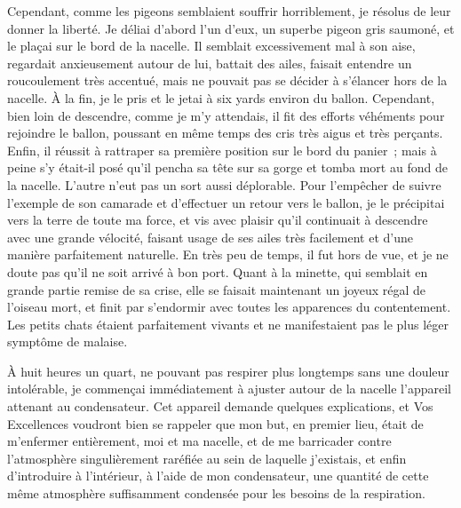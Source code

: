 \documentclass[french,twoside]{book} %
\begin{document}
Cependant, comme les pigeons semblaient souffrir horriblement, je résolus de leur donner la liberté. Je déliai d’abord l’un d’eux, un superbe pigeon gris saumoné, et le plaçai sur le bord de la nacelle. Il semblait excessivement mal à son aise, regardait anxieusement autour de lui, battait des ailes, faisait entendre un roucoulement très accentué, mais ne pouvait pas se décider à s’élancer hors de la nacelle. À la fin, je le pris et le jetai à six yards environ du ballon. Cependant, bien loin de descendre, comme je m’y attendais, il fit des efforts véhéments pour rejoindre le ballon, poussant en même temps des cris très aigus et très perçants. Enfin, il réussit à rattraper sa première position sur le bord du panier ; mais à peine s’y était-il posé qu’il pencha sa tête sur sa gorge et tomba mort au fond de la nacelle. L’autre n’eut pas un sort aussi déplorable. Pour l’empêcher de suivre l’exemple de son camarade et d’effectuer un retour vers le ballon, je le précipitai vers la terre de toute ma force, et vis avec plaisir qu’il continuait à descendre avec une grande vélocité, faisant usage de ses ailes très facilement et d’une manière parfaitement naturelle. En très peu de temps, il fut hors de vue, et je ne doute pas qu’il ne soit arrivé à bon port. Quant à la minette, qui semblait en grande partie remise de sa crise, elle se faisait maintenant un joyeux régal de l’oiseau mort, et finit par s’endormir avec toutes les apparences du contentement. Les petits chats étaient parfaitement vivants et ne manifestaient pas le plus léger symptôme de malaise.\par
À huit heures un quart, ne pouvant pas respirer plus longtemps sans une douleur intolérable, je commençai immédiatement à ajuster autour de la nacelle l’appareil attenant au condensateur. Cet appareil demande quelques explications, et Vos Excellences voudront bien se rappeler que mon but, en premier lieu, était de m’enfermer entièrement, moi et ma nacelle, et de me barricader contre l’atmosphère singulièrement raréfiée au sein de laquelle j’existais, et enfin d’introduire à l’intérieur, à l’aide de mon condensateur, une quantité de cette même atmosphère suffisamment condensée pour les besoins de la respiration.\par
\end{document}
